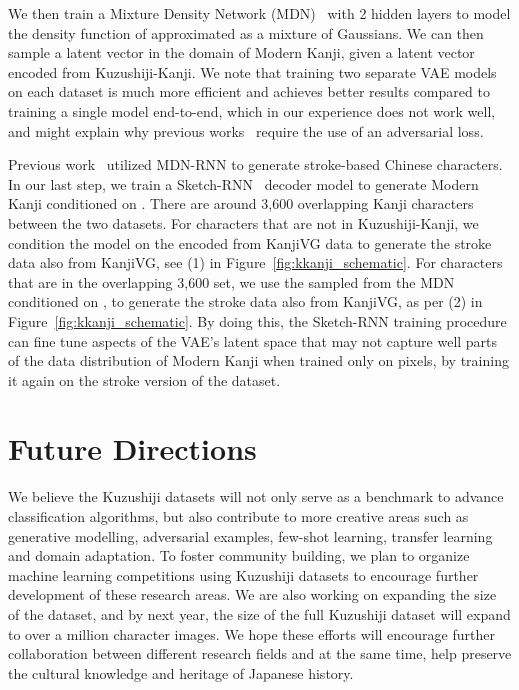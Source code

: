 \documentclass{article}
\begin{document}
\begin{CJK}{UTF8}{min}
We then train a Mixture Density Network (MDN)~\cite{bishop_mdn} with 2 hidden layers to model the density function of  approximated as a mixture of Gaussians. We can then sample a latent vector  in the domain of Modern Kanji, given a latent vector  encoded from Kuzushiji-Kanji. We note that training two separate VAE models on each dataset is much more efficient and achieves better results compared to training a single model end-to-end, which in our experience does not work well, and might explain why previous works~\cite{isola2017image,liu2017unsupervised,wolf2017unsupervised,bousmalis2017unsupervised} require the use of an adversarial loss.

Previous work~\cite{otoro,chinesechar} utilized MDN-RNN to generate stroke-based Chinese characters. In our last step, we train a Sketch-RNN~\cite{ha2017neural} decoder model to generate Modern Kanji conditioned on . There are around 3,600 overlapping Kanji characters between the two datasets. For characters that are not in Kuzushiji-Kanji, we condition the model on the  encoded from KanjiVG data to generate the stroke data also from KanjiVG, see (1) in Figure~\ref{fig:kkanji_schematic}. For characters that are in the overlapping 3,600 set, we use the  sampled from the MDN conditioned on , to generate the stroke data also from KanjiVG, as per (2) in Figure~\ref{fig:kkanji_schematic}. By doing this, the Sketch-RNN training procedure can fine tune aspects of the VAE's latent space that may not capture well parts of the data distribution of Modern Kanji when trained only on pixels, by training it again on the stroke version of the dataset.

\section{Future Directions}

We believe the Kuzushiji datasets will not only serve as a benchmark to advance classification algorithms, but also contribute to more creative areas such as generative modelling, adversarial examples, few-shot learning, transfer learning and domain adaptation. To foster community building, we plan to organize machine learning competitions using Kuzushiji datasets to encourage further development of these research areas. We are also working on expanding the size of the dataset, and by next year, the size of the full Kuzushiji dataset will expand to over a million character images. We hope these efforts will encourage further collaboration between different research fields and at the same time, help preserve the cultural knowledge and heritage of Japanese history.






\end{CJK}
\end{document}
